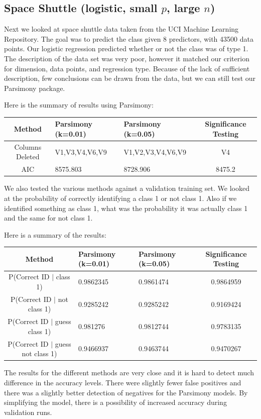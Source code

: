 \documentclass[letter]{article}
\begin{document}
\subsection*{Space Shuttle \cite{shuttle} (logistic, small $p$, large $n$)}
Next we looked at space shuttle data taken from the UCI Machine Learning Repository. The goal was to predict the class given 8 predictors, with 43500 data points. Our logistic regression predicted whether or not the class was of type 1.  The description of the data set was very poor, however it matched our criterion for dimension, data points, and regression type. Because of the lack of sufficient description, few conclusions can be drawn from the data, but we can still test our Parsimony package.

Here is the summary of results using Parsimony:

\begin{tabular}{ | c | p{3cm} | p{3.3cm} | c  |}
\hline
Method&Parsimony (k=0.01) & Parsimony (k=0.05) & Significance Testing \\
\hline
Columns Deleted& V1,V3,V4,V6,V9 & V1,V2,V3,V4,V6,V9 & V4 \\
\hline
AIC & 8575.803 & 8728.906 & 8475.2 \\
\hline
\end{tabular}

We also tested the various methods against a validation training set. We looked at the probability of correctly identifying a class 1 or not class 1. Also if we identified something as class 1, what was the probability it was actually class 1 and the same for not class 1.

Here is a summary of the results:

\begin{tabular}{ | c | p{3cm} | p{3.3cm} | c  |}
\hline
Method&Parsimony (k=0.01) & Parsimony (k=0.05) & Significance Testing \\
\hline
P(Correct ID $|$ class 1) & 0.9862345 & 0.9861474 & 0.9864959 \\
\hline
P(Correct ID $|$ not class 1) & 0.9285242 & 0.9285242 & 0.9169424 \\
\hline
P(Correct ID $|$ guess class 1) & 0.981276 & 0.9812744 & 0.9783135 \\
\hline
P(Correct ID $|$ guess not class 1) & 0.9466937 & 0.9463744 & 0.9470267  \\
\hline
\end{tabular}

The results for the different methods are very close and it is hard to detect much difference in the accuracy levels. There were slightly fewer false positives and there was a slightly better detection of negatives for the Parsimony models. By simplifying the model, there is a possibility of increased accuracy during validation runs.
\\
\\
\end{document}
